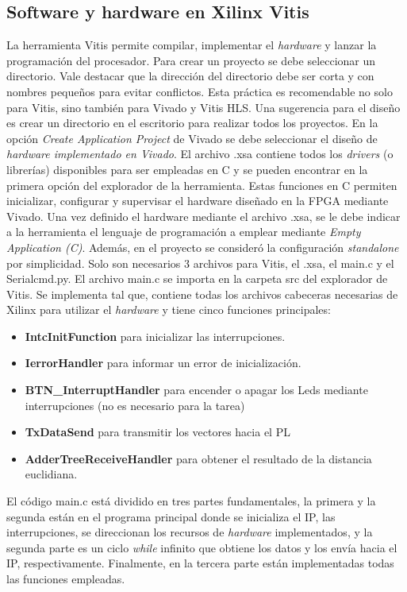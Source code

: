 \documentclass[conference]{IEEEtran}
\begin{document}
\subsection{Software y hardware en Xilinx Vitis}
La  herramienta Vitis permite compilar, implementar el \textit{hardware} y lanzar la programación del procesador. Para crear un proyecto se debe seleccionar un directorio. Vale destacar que la dirección del directorio debe ser corta y con nombres pequeños para evitar conflictos. Esta práctica es recomendable no solo para Vitis, sino también para Vivado y Vitis HLS. Una sugerencia para el diseño es crear un directorio en el escritorio para realizar todos los proyectos. En la opción  \textit{Create Application Project} de Vivado se debe seleccionar el diseño de \textit{hardware implementado en Vivado}. El archivo .xsa contiene todos los \textit{drivers} (o librerías) disponibles para ser empleadas en C y se pueden encontrar en la primera opción del explorador de la herramienta. Estas funciones en C permiten inicializar, configurar y supervisar el hardware diseñado en la FPGA mediante Vivado. Una vez definido el hardware mediante el archivo .xsa, se le debe indicar a la herramienta el lenguaje de programación a emplear mediante \textit{Empty Application (C)}. Además, en el proyecto  se consideró la configuración \textit{standalone} por simplicidad. Solo son necesarios   3 archivos para  Vitis, el .xsa, el main.c y el  Serialcmd.py. El archivo main.c  se importa en la carpeta src del explorador de Vitis. Se implementa tal que, contiene todas los archivos cabeceras necesarias  de Xilinx para utilizar  el \textit{hardware} y tiene  cinco funciones principales:
\begin{itemize}
    \item  \textbf{IntcInitFunction} para inicializar las interrupciones.
    \item \textbf{IerrorHandler} para informar un error de inicialización.
    \item \textbf{BTN\_InterruptHandler} para encender o apagar los Leds mediante interrupciones (no es necesario para la tarea)
    \item \textbf{TxDataSend} para transmitir los vectores hacia el PL 
    \item \textbf{AdderTreeReceiveHandler} para obtener el resultado de la distancia euclidiana.
\end{itemize}
El código main.c está dividido en tres partes fundamentales,  la primera y la segunda están en el programa principal donde se inicializa el IP, las interrupciones, se direccionan los recursos de \textit{hardware } implementados, y la segunda parte es un ciclo \textit{while} infinito que obtiene los datos y los envía hacia el IP, respectivamente.  Finalmente,  en la tercera parte están implementadas todas las funciones empleadas. \par
\end{document}
